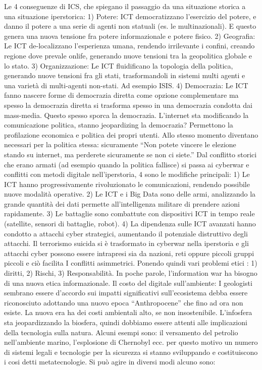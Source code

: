 \documentclass[11pt, a4page, twocolumn]{article}
\begin{document}
Le 4 conseguenze di ICS, che spiegano il passaggio da una situazione storica a una situazione iperstorica:
    1) Potere: ICT democratizzano l'esercizio del potere, e danno il potere a una serie di agenti non statuali (es. le multinazionali). E questo genera una nuova tensione fra potere informazionale e potere fisico.
    2) Geografia: Le ICT de-localizzano l’esperienza umana, rendendo irrilevante i confini, creando regione dove prevale onlife, generando nuove tensioni tra la geopolitica globale e lo stato.
    3) Organizzazione: Le ICT fluidificano la topologia della politica, generando nuove tensioni fra gli stati, trasformandoli in sistemi multi agenti e una varietà di multi-agenti non-stati. Ad esempio ISIS.
    4) Democrazia: Le ICT fanno nascere forme di democrazia diretta come opzione complementare ma spesso la democrazia diretta si trasforma spesso in una democrazia condotta dai mass-media. Questo spesso sporca la democrazia.
L’internet sta modificando la comunicazione politica, stanno jeopardizing la democrazia? Permettono la profilazione economica e politica dei propri utenti. Allo stesso momento diventano  necessari per la politica stessa: sicuramente “Non potete vincere le elezione stando su internet, ma perderete sicuramente se non ci siete.” 
Dal conflitto storici che erano armati (ad esempio quando la politica fallisce) si passa ai cyberwar e conflitti con metodi digitale nell’iperstoria, 4 sono le modifiche principali:
    1) Le ICT hanno progressivamente rivoluzionato le comunicazioni, rendendo possibile nuove modalità operative.
    2) Le ICT e i Big Data sono delle armi, analizzando la grande quantità dei dati permette all’intelligenza militare di prendere azioni rapidamente.
    3) Le battaglie sono combattute con dispositivi ICT in tempo reale (satellite, sensori di battaglie, robot).
    4) La dipendenza sulle ICT avanzati hanno condotto a attacchi cyber strategici, aumentando il potenziale distruttivo degli attacchi.
Il terrorismo suicida si è trasformato in cyberwar nella iperstoria e gli attacchi cyber possono essere intrapresi sia da nazioni, reti oppure piccoli gruppi piccoli e ciò facilita I conflitti asimmetrici. Ponendo quindi vari problemi etici : 1) diritti, 2) Rischi, 3) Responsabilità. In poche parole, l’information war ha bisogno di una nuova etica informazionale.
Il costo del digitale sull’ambiente:
I geologisti sembrano essere d’accordo sui impatti significativi sull’ecosistema debba essere riconosciuto adottando una nuovo epoca “Anthropocene” che fino ad ora non esiste. La nuova era ha dei costi ambientali alto, se non insostenibile. L’infosfera sta jeopardizzando la biosfera, quindi dobbiamo essere attenti alle implicazioni della tecnologia sulla natura. Alcuni esempi sono: il versamento del petrolio nell’ambiente marino, l’esplosione di Chernobyl ecc. per questo motivo un numero di sistemi legali e tecnologie per la sicurezza si stanno sviluppando e costituiscono i cosi detti metatecnologie.  Si può agire in diversi modi alcuno sono:
\end{document}
